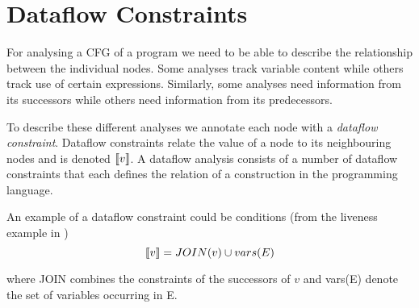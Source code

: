 \section{Dataflow Constraints}
For analysing a CFG of a program we need to be able to describe the relationship between the individual nodes.
Some analyses track variable content while others track use of certain expressions.
Similarly, some analyses need information from its successors while others need information from its predecessors.

To describe these different analyses we annotate each node with a \emph{dataflow constraint}.
Dataflow constraints relate the value of a node to its neighbouring nodes and is denoted $\llbracket v \rrbracket$.
A dataflow analysis consists of a number of dataflow constraints that each defines the relation of a construction in the programming language.

An example of a dataflow constraint could be conditions (from the liveness example in \citet{schwartzbach})
\[ \llbracket v \rrbracket = JOIN(v) \cup vars(E) \]

where JOIN combines the constraints of the successors of $v$ and vars(E) denote the set of variables occurring in E.
